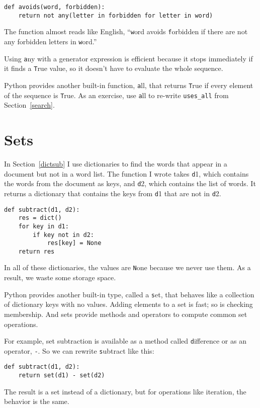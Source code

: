 \documentclass[
DIV=11,
fontsize=12,
twoside,
headinclude=false,
titlepage=firstiscover,
abstract=true,
headsepline=true,
footsepline=true,
chapterprefix=true, %
headings=big,
bibliography=totoc,%
captions=tableheading
]{scrbook}
\theoremstyle{definition}
\begin{document}
\begin{lstlisting}
def avoids(word, forbidden):
    return not any(letter in forbidden for letter in word)
\end{lstlisting}
%
The function almost reads like English, ``{\texttt word} avoids
{\texttt forbidden} if there are not any forbidden letters in {\texttt word}.''

Using {\texttt any} with a generator expression is efficient because
it stops immediately if it finds a {\texttt True} value,
so it doesn't have to evaluate the whole sequence.

Python provides another built-in function, {\texttt all}, that returns
{\texttt True} if every element of the sequence is {\texttt True}.  As
an exercise, use {\texttt all} to re-write \verb"uses_all" from
Section~\ref{search}.


\section{Sets}
\label{sets}

In Section~\ref{dictsub} I use dictionaries to find the words
that appear in a document but not in a word list.  The function
I wrote takes {\texttt d1}, which contains the words from the document
as keys, and {\texttt d2}, which contains the list of words.  It
returns a dictionary that contains the keys from {\texttt d1} that
are not in {\texttt d2}.

\begin{lstlisting}
def subtract(d1, d2):
    res = dict()
    for key in d1:
        if key not in d2:
            res[key] = None
    return res
\end{lstlisting}
%
In all of these dictionaries, the values are {\texttt None} because
we never use them.  As a result, we waste some storage space.

Python provides another built-in type, called a {\texttt set}, that
behaves like a collection of dictionary keys with no values.  Adding
elements to a set is fast; so is checking membership.  And sets
provide methods and operators to compute common set operations.

For example, set subtraction is available as a method called
{\texttt difference} or as an operator, {\texttt -}.  So we can rewrite
{\texttt subtract} like this:

\begin{lstlisting}
def subtract(d1, d2):
    return set(d1) - set(d2)
\end{lstlisting}
%
The result is a set instead of a dictionary, but for operations like
iteration, the behavior is the same.
\end{document}
